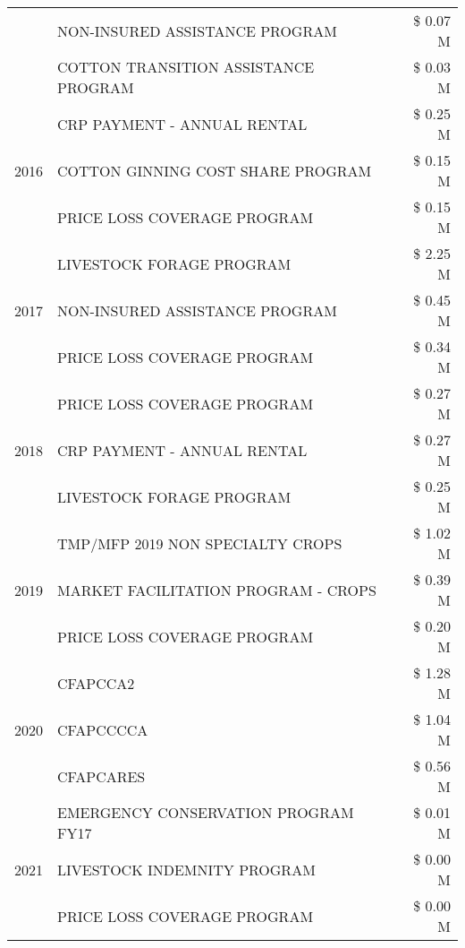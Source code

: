 \begin{tabular}{llr}
 & NON-INSURED ASSISTANCE PROGRAM & \$ 0.07 M \\
 & COTTON TRANSITION ASSISTANCE PROGRAM & \$ 0.03 M \\
\cline{1-3}
\multirow[t]{3}{*}{2016} & CRP PAYMENT - ANNUAL RENTAL                   & \$ 0.25 M \\
 & COTTON GINNING COST SHARE PROGRAM             & \$ 0.15 M \\
 & PRICE LOSS COVERAGE PROGRAM                   & \$ 0.15 M \\
\cline{1-3}
\multirow[t]{3}{*}{2017} & LIVESTOCK FORAGE PROGRAM & \$ 2.25 M \\
 & NON-INSURED ASSISTANCE PROGRAM & \$ 0.45 M \\
 & PRICE LOSS COVERAGE PROGRAM & \$ 0.34 M \\
\cline{1-3}
\multirow[t]{3}{*}{2018} & PRICE LOSS COVERAGE PROGRAM & \$ 0.27 M \\
 & CRP PAYMENT - ANNUAL RENTAL & \$ 0.27 M \\
 & LIVESTOCK FORAGE PROGRAM & \$ 0.25 M \\
\cline{1-3}
\multirow[t]{3}{*}{2019} & TMP/MFP 2019 NON SPECIALTY CROPS & \$ 1.02 M \\
 & MARKET FACILITATION PROGRAM - CROPS & \$ 0.39 M \\
 & PRICE LOSS COVERAGE PROGRAM & \$ 0.20 M \\
\cline{1-3}
\multirow[t]{3}{*}{2020} & CFAPCCA2 & \$ 1.28 M \\
 & CFAPCCCCA & \$ 1.04 M \\
 & CFAPCARES & \$ 0.56 M \\
\cline{1-3}
\multirow[t]{3}{*}{2021} & EMERGENCY CONSERVATION PROGRAM FY17 & \$ 0.01 M \\
 & LIVESTOCK INDEMNITY PROGRAM & \$ 0.00 M \\
 & PRICE LOSS COVERAGE PROGRAM & \$ 0.00 M \\
\cline{1-3}
\bottomrule
\end{tabular}
